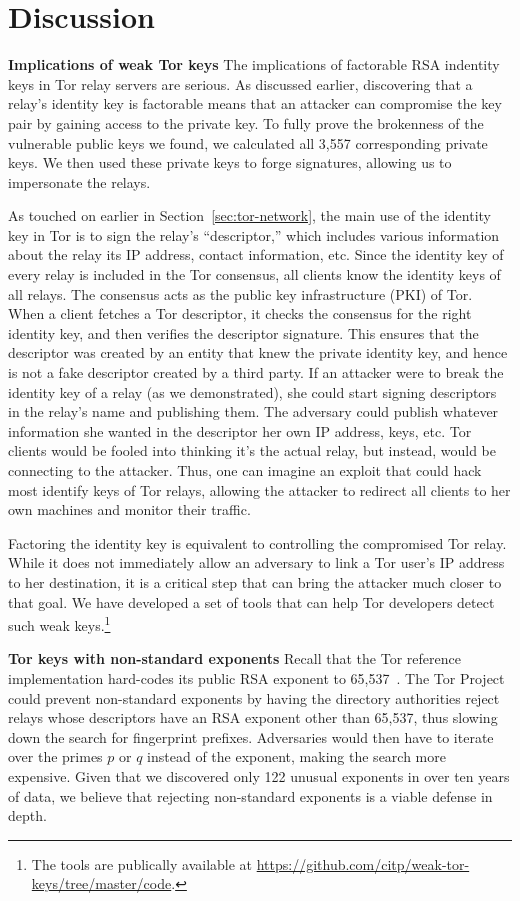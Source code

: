 \section{Discussion}
\label{sec:discussion}
\textbf{Implications of weak Tor keys}
The implications of factorable RSA indentity keys in Tor relay servers are
serious. As discussed earlier, discovering that a relay's identity key is
factorable means that an attacker can compromise the key pair by gaining access
to the private key. To fully prove the brokenness of the vulnerable public keys
we found, we calculated all 3,557 corresponding private keys. We then used these
private keys to forge signatures, allowing us to impersonate the relays.

As touched on earlier in Section~\ref{sec:tor-network}, the main use of the
identity key in Tor is to sign the relay's ``descriptor,'' which
includes various information about the relay \eg its IP address, contact
information, etc. Since the identity key of every relay is included in the Tor
consensus, all clients know the identity keys of all relays. The consensus acts
as the public key infrastructure (PKI) of Tor. When a client fetches a Tor
descriptor, it checks the consensus for the right identity key, and then
verifies the descriptor signature. This ensures that the descriptor was created
by an entity that knew the private identity key, and hence is not a fake
descriptor created by a third party. If an attacker were to break the identity
key of a relay (as we demonstrated), she could start signing descriptors in the
relay's name and publishing them. The adversary could publish whatever
information she wanted in the descriptor \eg her own IP address, keys, etc. Tor
clients would be fooled into thinking it's the actual relay, but instead, would
be connecting to the attacker. Thus, one can imagine an exploit that could hack
most identify keys of Tor relays, allowing the attacker to redirect all clients
to her own machines and monitor their traffic.

Factoring the identity key is equivalent to controlling the compromised Tor
relay. While it does not immediately allow an adversary to link a Tor user's IP
address to her destination, it is a critical step that can bring the attacker
much closer to that goal. We have developed a set of tools that can help Tor
developers detect such weak keys.\footnote{The tools are publically available at
\url{https://github.com/citp/weak-tor-keys/tree/master/code}.}

\textbf{Tor keys with non-standard exponents} Recall that the Tor reference
implementation hard-codes its public RSA exponent to
65,537~\cite[\S~0.3]{torspec}.  The Tor Project could prevent non-standard
exponents by having the directory authorities reject relays whose descriptors
have an RSA exponent other than 65,537, thus slowing down the search for
fingerprint prefixes.  Adversaries would then have to iterate over the primes
$p$ or $q$ instead of the exponent, making the search more expensive.  Given
that we discovered only 122 unusual exponents in over ten years of data, we
believe that rejecting non-standard exponents is a viable defense in depth.

